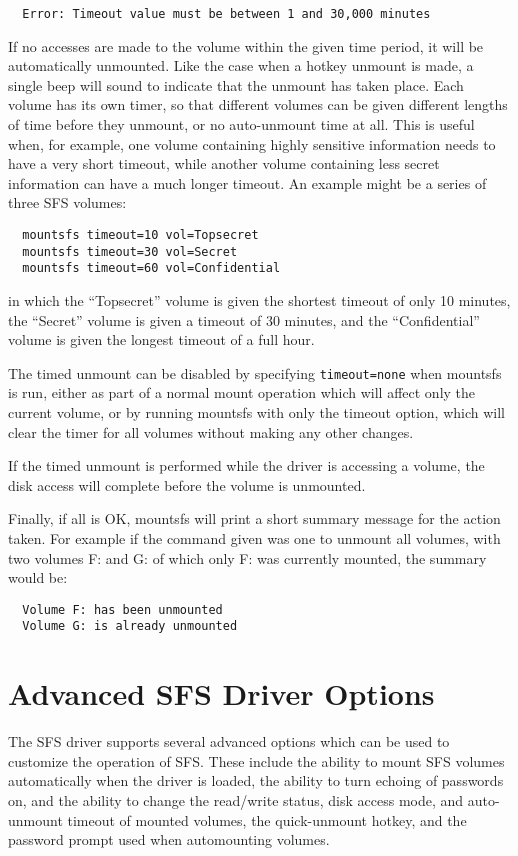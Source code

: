 {\tt \verb|  |Error: Timeout value must be between 1 and 30,000 minutes}

If no accesses are made to the volume within the given time period, it will be
automatically unmounted.  Like the case when a hotkey unmount is made, a single
beep will sound to indicate that the unmount has taken place.  Each volume has
its own timer, so that different volumes can be given different lengths of time
before they unmount, or no auto-unmount time at all.  This is useful when, for
example, one volume containing highly sensitive information needs to have a
very short timeout, while another volume containing less secret information can
have a much longer timeout.  An example might be a series of three SFS volumes:

\begin{verbatim}
  mountsfs timeout=10 vol=Topsecret
  mountsfs timeout=30 vol=Secret
  mountsfs timeout=60 vol=Confidential
\end{verbatim}

in which the ``Topsecret'' volume is given the shortest timeout of only 10
minutes, the ``Secret'' volume is given a timeout of 30 minutes, and the
``Confidential'' volume is given the longest timeout of a full hour.

The timed unmount can be disabled by specifying {\tt timeout=none} when mountsfs is
run, either as part of a normal mount operation which will affect only the
current volume, or by running mountsfs with only the timeout option, which will
clear the timer for all volumes without making any other changes.

If the timed unmount is performed while the driver is accessing a volume, the
disk access will complete before the volume is unmounted.

Finally, if all is OK, mountsfs will print a short summary message for the
action taken.  For example if the command given was one to unmount all volumes,
with two volumes F: and G: of which only F: was currently mounted, the summary
would be:

{\tt \verb|  |Volume F: has been unmounted\\
     \verb|  |Volume G: is already unmounted}


\section{Advanced SFS Driver Options}

The SFS driver supports several advanced options which can be used to customize
the operation of SFS.  These include the ability to mount SFS volumes
automatically when the driver is loaded, the ability to turn echoing of
passwords on, and the ability to change the read/write status, disk access
mode, and auto-unmount timeout of mounted volumes, the quick-unmount hotkey, 
and the password prompt used when automounting volumes.


